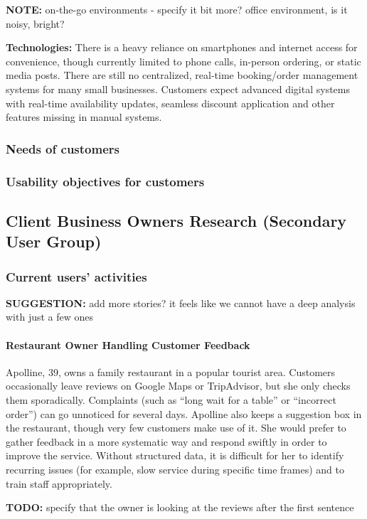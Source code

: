 \documentclass[]{VUMIFTemplateClass}
\newcommand{\noticecomment}[1]{%
    \begin{tcolorbox}[colback=blue!20, colframe=blue!60, arc=0pt, outer arc=0pt, boxrule=1pt, left=3pt, right=3pt, top=3pt, bottom=3pt]
        \textbf{\textcolor{blue!70!black}{NOTE:}} #1
    \end{tcolorbox}
}
\newcommand{\todocomment}[1]{%
    \begin{tcolorbox}[colback=red!20, colframe=red!60, arc=0pt, outer arc=0pt, boxrule=1pt, left=3pt, right=3pt, top=3pt, bottom=3pt]
        \textbf{\textcolor{orange!70!black}{TODO:}} #1
    \end{tcolorbox}
}
\newcommand{\suggestioncomment}[1]{%
    \definecolor{lime}{RGB}{50,205,50}%
    \begin{tcolorbox}[colback=lime!15, colframe=lime!60, arc=0pt, outer arc=0pt, boxrule=1pt, left=3pt, right=3pt, top=3pt, bottom=3pt]
        \textbf{\textcolor{lime!70!black}{SUGGESTION:}} #1
    \end{tcolorbox}%
}
\newcommand{\subsubsubsection}[1]{\paragraph{#1}}
\begin{document}
\noticecomment{on-the-go environments - specify it bit more? office environment, is it noisy, bright?}

\textbf{Technologies:} There is a heavy reliance on smartphones and internet
access for convenience, though currently limited to phone calls, in-person
ordering, or static media posts. There are still no centralized, real-time
booking/order management systems for many small businesses. Customers expect
advanced digital systems with real-time availability updates, seamless discount
application and other features missing in manual systems.

\subsubsection{Needs of customers}

\subsubsection{Usability objectives for customers}

\subsection{Client Business Owners Research (Secondary User Group)}

\subsubsection{Current users' activities}
\suggestioncomment{add more stories? it feels like we cannot have a deep analysis with just a few ones}

\subsubsubsection{Restaurant Owner Handling Customer Feedback}

Apolline, 39, owns a family restaurant in a popular tourist area. Customers
occasionally leave reviews on Google Maps or TripAdvisor, but she only checks
them sporadically. Complaints (such as “long wait for a table” or “incorrect
order”) can go unnoticed for several days. Apolline also keeps a suggestion box
in the restaurant, though very few customers make use of it. She would prefer to
gather feedback in a more systematic way and respond swiftly in order to improve
the service. Without structured data, it is difficult for her to identify
recurring issues (for example, slow service during specific time frames) and to
train staff appropriately.

\todocomment{specify that the owner is looking at the reviews after the first sentence}
\end{document}
